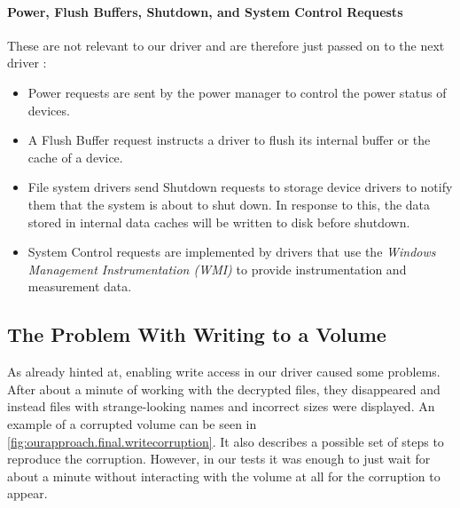 \paragraph{Power, Flush Buffers, Shutdown, and System Control Requests} These are not relevant to our driver and are therefore just passed on to the next driver \cite{Kerneldriver}:
\begin{itemize}
	\item Power requests are sent by the power manager to control the power status of devices.
	\item A Flush Buffer request instructs a driver to flush its internal buffer or the cache of a device.
	\item File system drivers send Shutdown requests to storage device drivers to notify them that the system is about to shut down. In response to this, the data stored in internal data caches will be written to disk before shutdown.
	\item System Control requests are implemented by drivers that use the \emph{Windows Management Instrumentation (WMI)} to provide instrumentation and measurement data.
\end{itemize}

\subsection{The Problem With Writing to a Volume}
\label{chap:ourapproach.final.writeproblem}
As already hinted at, enabling write access in our driver caused some problems. After about a minute of working with the decrypted files, they disappeared and instead files with strange-looking names and incorrect sizes were displayed. An example of a corrupted volume can be seen in \autoref{fig:ourapproach.final.writecorruption}. It also describes a possible set of steps to reproduce the corruption. However, in our tests it was enough to just wait for about a minute without interacting with the volume at all for the corruption to appear.

